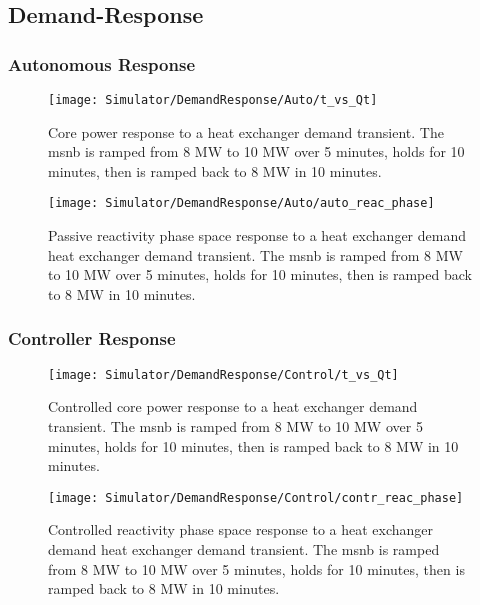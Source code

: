 \subsection{Demand-Response}

\subsubsection{Autonomous Response}
\begin{figure}[ht!]
    \centering
    \texttt{[image: Simulator/DemandResponse/Auto/t\_vs\_Qt]}
    \caption[Autonomous Demand-Response Power Response]{Core power response to a heat exchanger demand transient. The \acs{msnb} is ramped from 8 MW to 10 MW over 5 minutes, holds for 10 minutes, then is ramped back to 8 MW in 10 minutes.}
    \label{fig:Demand-Power-Auto}
\end{figure}

\begin{figure}[ht!]
    \centering
    \texttt{[image: Simulator/DemandResponse/Auto/auto\_reac\_phase]}
    \caption[Autonomous Demand-Response Reactivity Phase Space]{Passive reactivity phase space response to a heat exchanger demand heat exchanger demand transient. The \acs{msnb} is ramped from 8 MW to 10 MW over 5 minutes, holds for 10 minutes, then is ramped back to 8 MW in 10 minutes.}
    \label{fig:Demand-PassivePhase-Auto}
\end{figure}
\clearpage

\subsubsection{Controller Response}
\begin{figure}[ht!]
    \centering
    \texttt{[image: Simulator/DemandResponse/Control/t\_vs\_Qt]}
    \caption[Controlled Demand-Response Power Response ]{Controlled core power response to a heat exchanger demand transient. The \acs{msnb} is ramped from 8 MW to 10 MW over 5 minutes, holds for 10 minutes, then is ramped back to 8 MW in 10 minutes.}
    \label{fig:Demand-Power-Ctr}
\end{figure}

\begin{figure}[ht!]
    \centering
    \texttt{[image: Simulator/DemandResponse/Control/contr\_reac\_phase]}
    \caption[Controlled Demand-Response Reactivity Phase Space]{Controlled reactivity phase space response to a heat exchanger demand heat exchanger demand transient. The \acs{msnb} is ramped from 8 MW to 10 MW over 5 minutes, holds for 10 minutes, then is ramped back to 8 MW in 10 minutes.}
    \label{fig:Demand-ControlPhase-Ctr}
\end{figure}
\clearpage